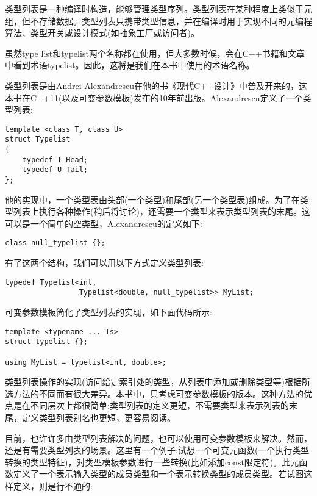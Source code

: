 
类型列表是一种编译时构造，能够管理类型序列。类型列表在某种程度上类似于元组，但不存储数据。类型列表只携带类型信息，并在编译时用于实现不同的元编程算法、类型开关或设计模式(如抽象工厂或访问者)。

\begin{tcolorbox}[breakable,enhanced jigsaw,colback=blue!5!white,colframe=blue!75!black,title={重要的Note}]
虽然type list和typelist两个名称都在使用，但大多数时候，会在C++书籍和文章中看到术语typelist。因此，这将是我们在本书中使用的术语名称。
\end{tcolorbox}

类型列表是由Andrei Alexandrescu在他的书《现代C++设计》中普及开来的，这本书在C++11(以及可变参数模板)发布的10年前出版。Alexandrescu定义了一个类型列表:

\begin{lstlisting}[style=styleCXX]
template <class T, class U>
struct Typelist
{
	typedef T Head;
	typedef U Tail;
};
\end{lstlisting}

他的实现中，一个类型表由头部(一个类型)和尾部(另一个类型表)组成。为了在类型列表上执行各种操作(稍后将讨论)，还需要一个类型来表示类型列表的末尾。这可以是一个简单的空类型，Alexandrescu的定义如下:

\begin{lstlisting}[style=styleCXX]
class null_typelist {};
\end{lstlisting}

有了这两个结构，我们可以用以下方式定义类型列表:

\begin{lstlisting}[style=styleCXX]
typedef Typelist<int,
				 Typelist<double, null_typelist>> MyList;
\end{lstlisting}

可变参数模板简化了类型列表的实现，如下面代码所示:

\begin{lstlisting}[style=styleCXX]
template <typename ... Ts>
struct typelist {};

using MyList = typelist<int, double>;
\end{lstlisting}

类型列表操作的实现(访问给定索引处的类型，从列表中添加或删除类型等)根据所选方法的不同而有很大差异。本书中，只考虑可变参数模板的版本。这种方法的优点是在不同层次上都很简单:类型列表的定义更短，不需要类型来表示列表的末尾，定义类型列表别名也更短，更容易阅读。

目前，也许许多由类型列表解决的问题，也可以使用可变参数模板来解决。然而，还是有需要类型列表的场景。这里有一个例子:试想一个可变元函数(一个执行类型转换的类型特征)，对类型模板参数进行一些转换(比如添加const限定符)。此元函数定义了一个表示输入类型的成员类型和一个表示转换类型的成员类型。若试图这样定义，则是行不通的:

